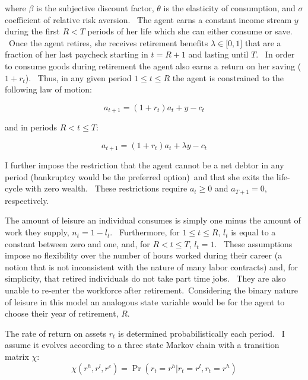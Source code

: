 \documentclass[12pt]{article}
\begin{document}
\noindent%
where $\beta $ is the subjective discount factor, $\theta $ is the
elasticity of consumption, and $\sigma $ coefficient of relative risk
aversion. \ The agent earns a constant income stream $y$ during the first $%
R<T$ periods of her life which she can either consume or save. \ Once the
agent retires, she receives retirement benefits $\lambda \in \lbrack 0,1]$
that are a fraction of her last paycheck starting in $t=R+1$ and lasting
until $T.$ \ In order to consume goods during retirement the agent also
earns a return on her saving ($1+r_{t}$). \ Thus, in any given period $1\leq
t\leq R$ the agent is constrained to the following law of motion:

\begin{equation}
a_{t+1}=(1+r_{t})a_{t}+y-c_{t}
\end{equation}

\noindent%
and in periods $R<t\leq T$:

\begin{equation}
a_{t+1}=(1+r_{t})a_{t}+\lambda y-c_{t}
\end{equation}

I further impose the restriction that the agent cannot be a net debtor in
any period (bankruptcy would be the preferred option)\ and that she exits
the life-cycle with zero wealth. \ These restrictions require $a_{t}\geq 0$
and $a_{T+1}=0$, respectively. \ 

The amount of leisure an individual consumes is simply one minus the amount
of work they supply, $n_{t}=1-l_{t}$. \ Furthermore, for $1\leq t\leq R$, $%
l_{t}$ is equal to a constant between zero and one, and, for $R<t\leq T$, $%
l_{t}=1$. \ These assumptions impose no flexibility over the number of hours
worked during their career (a notion that is not inconsistent with the
nature of many labor contracts) and, for simplicity, that retired
individuals do not take part time jobs. \ They are also unable to re-enter
the workforce after retirement.\ Considering the binary nature of leisure in
this model an analogous state variable would be for the agent to choose
their year of retirement, $R$.

The rate of return on assets $r_{t}$ is determined probabilistically each
period. \ I assume it evolves according to a three state Markov chain with a
transition matrix $\chi $:%
\begin{equation}
\chi (r^{h},r^{l},r^{c})=\Pr (r_{t}=r^{h}|r_{t}=r^{l},r_{t}=r^{h})
\end{equation}
\end{document}
